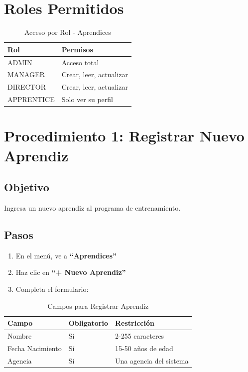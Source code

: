 \documentclass[12pt,a4paper,spanish,oneside]{report}
\begin{document}
\section{Roles Permitidos}

\begin{table}[H]
\centering
\caption{Acceso por Rol - Aprendices}
\begin{tabular}{|l|l|}
\hline
\textbf{Rol} & \textbf{Permisos} \\
\hline
ADMIN & Acceso total \\
\hline
MANAGER & Crear, leer, actualizar \\
\hline
DIRECTOR & Crear, leer, actualizar \\
\hline
APPRENTICE & Solo ver su perfil \\
\hline
\end{tabular}
\end{table}

\section{Procedimiento 1: Registrar Nuevo Aprendiz}

\subsection{Objetivo}

Ingresa un nuevo aprendiz al programa de entrenamiento.

\subsection{Pasos}

\begin{enumerate}
    \item En el menú, ve a \textbf{``Aprendices''}
    \item Haz clic en \textbf{``+ Nuevo Aprendiz''}
    \item Completa el formulario:
\end{enumerate}

\begin{table}[H]
\centering
\caption{Campos para Registrar Aprendiz}
\begin{tabular}{|l|l|l|}
\hline
\textbf{Campo} & \textbf{Obligatorio} & \textbf{Restricción} \\
\hline
Nombre & Sí & 2-255 caracteres \\
\hline
Fecha Nacimiento & Sí & 15-50 años de edad \\
\hline
Agencia & Sí & Una agencia del sistema \\
\hline
\end{tabular}
\end{table}
\end{document}
